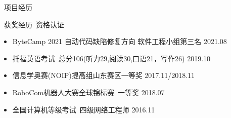 \documentclass[UTF8]{resume}
\begin{document}
\begin{rSection}{\faUsers~项目经历}


\end{rSection}

\begin{rSection}{\faAward~获奖经历~资格认证}
    \begin{itemize}
        \itemsep -0.5em
        \item ByteCamp 2021 自动代码缺陷修复方向 软件工程小组第三名 \hfill 2021.08
        \item 托福英语考试~总分106(听力29,阅读30,口语21，写作26) \hfill 2019.10
        \item 信息学奥赛(NOIP)提高组山东赛区一等奖 \hfill 2017.11/2018.11
        \item RoboCom机器人大赛全球锦标赛~一等奖 \hfill 2018.07
        \item 全国计算机等级考试~四级网络工程师 \hfill 2016.11
    \end{itemize}
\end{rSection}
\end{document}
